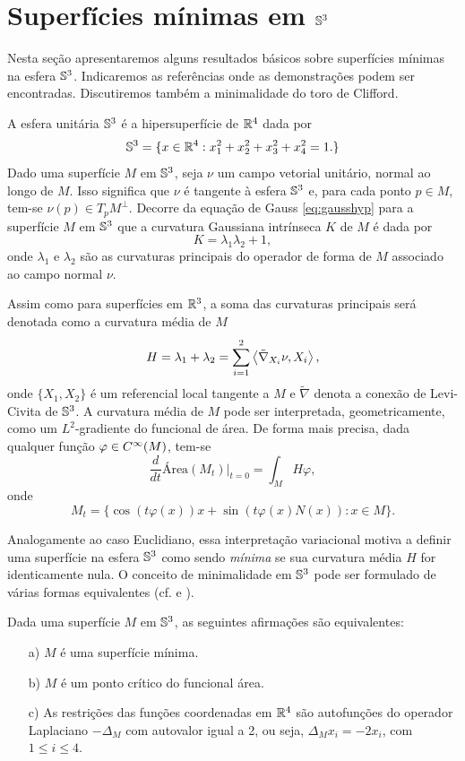 \section{Superfícies mínimas em $\mathbb{S}^3$}

Nesta seção apresentaremos alguns resultados básicos sobre superfícies mínimas na esfera $\mathbb{S}^3$. Indicaremos as referências onde as demonstrações podem ser encontradas. Discutiremos também a minimalidade do toro de Clifford.

A esfera unitária $\mathbb{S}^3$ é a hipersuperfície de $\mathbb{R}^4$ dada por
\[ \mathbb{S}^3 = \{ x \in \mathbb{R}^4: x_1^2 + x_2^2 + x_3^2 + x_4^2 = 1. \} \]
Dado uma superfície $M$ em $\mathbb{S}^3$, seja $\nu$ um campo vetorial unitário, normal ao longo de $M$. Isso significa que $\nu$ é tangente à esfera $\mathbb{S}^3$ e, para cada ponto $p \in M$, tem-se $\nu(p) \in T_p M^\perp$. Decorre da equação de Gauss \eqref{eq:gausshyp} para a superfície $M$ em $\mathbb{S}^3$ que a curvatura Gaussiana intrínseca $K$ de $M$ é dada por
\[ K = \lambda_1 \lambda_2 + 1, \]
onde $\lambda_1$ e $\lambda_2$ são as curvaturas principais do operador de forma de $M$ associado ao campo normal $\nu$.

Assim como para superfícies em $\mathbb{R}^3$, a soma das curvaturas principais será denotada como a curvatura média de $M$
\[ H = \lambda_1 + \lambda_2 = \sum_{i=1}^{2} \left\langle \tilde{\nabla}_{X_i} \nu,X_i \right\rangle, \]
onde $\{X_1,X_2\}$ é um referencial local tangente a $M$ e $\tilde{\nabla}$ denota a conexão de Levi-Civita de $\mathbb{S}^3$. A curvatura média de $M$ pode ser interpretada, geometricamente, como um $L^2$-gradiente do funcional de área. De forma mais precisa, dada qualquer função $\varphi \in C^\infty(M)$, tem-se
\[ \frac{d}{dt} \text{Área} (M_t) \vert_{t=0} = \int_M H \varphi, \]
onde
\[ M_t = \{ \cos(t \varphi(x))x + \sin(t \varphi(x) N(x)): x \in M \}. \]

Analogamente ao caso Euclidiano, essa interpretação variacional motiva a definir uma superfície na esfera $\mathbb{S}^3$ como sendo \emph{mínima} se sua curvatura média $H$ for identicamente nula. O conceito de minimalidade em $\mathbb{S}^3$ pode ser formulado de várias formas equivalentes (cf. \cite[Theorem 3.2.1]{Simons1968} e \cite{Dajczer2019}).

\begin{teorema}\label{propriedades_sup_min_S3}
	Dada uma superfície $M$ em $\mathbb{S}^3$, as seguintes afirmações são equivalentes:
	\begin{enumerate}
		\item[a)] $M$ é uma superfície mínima.
		\item[b)] $M$ é um ponto crítico do funcional área.
		\item[c)] As restrições das funções coordenadas em $\mathbb{R}^4$ são autofunções do operador Laplaciano $-\Delta_M$ com autovalor igual a 2, ou seja, $\Delta_M x_i = -2 x_i$, com $1 \leq i \leq 4$.
	\end{enumerate}
\end{teorema}

